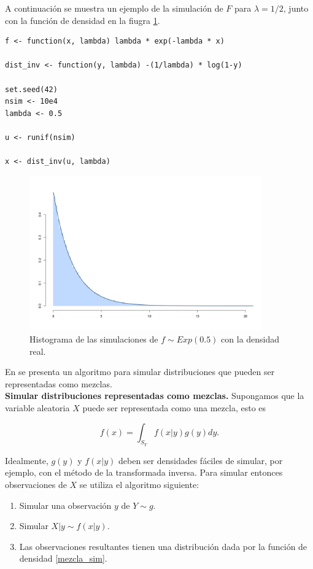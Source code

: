\documentclass[11pt,a4paper]{article}
\begin{document}
A continuación se muestra un ejemplo de la simulación de $F$ para $\lambda = 1/2$, junto con la función de densidad en la fiugra \ref{fig:transformada_inversa}.\\

\begin{lstlisting}
f <- function(x, lambda) lambda * exp(-lambda * x)

dist_inv <- function(y, lambda) -(1/lambda) * log(1-y)

set.seed(42)
nsim <- 10e4
lambda <- 0.5

u <- runif(nsim)

x <- dist_inv(u, lambda)
\end{lstlisting}

\begin{figure} 
\centering\includegraphics[width=10cm]{transformada_inversa.png}
\caption{Histograma de las simulaciones de $f \sim Exp(0.5)$ con la densidad real.}
\label{fig:transformada_inversa}
\end{figure}

En \citet{casella} se presenta un algoritmo para simular distribuciones que pueden ser representadas como mezclas.\\

\textbf{Simular distribuciones representadas como mezclas.} Supongamos que la variable aleatoria $X$ puede ser representada como una mezcla, esto es

\begin{equation}
f(x) = \int_{S_Y} f(x|y)g(y)dy.
\label{mezcla_sim}
\end{equation}

Idealmente, $g(y)$ y $f(x|y)$ deben ser densidades fáciles de simular, por ejemplo, con el método de la transformada inversa. Para simular entonces observaciones de $X$ se utiliza el algoritmo siguiente:

\begin{enumerate}
\item Simular una observación $y$ de $Y\sim g$.\\
\item Simular $X|y \sim f(x|y)$.\\
\item Las observaciones resultantes tienen una distribución dada por la función de densidad \eqref{mezcla_sim}.\\
\end{enumerate}
\end{document}

